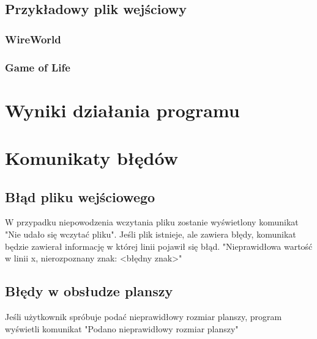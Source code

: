 \documentclass[10pt, oneside]{article}
\begin{document}
\subsection{Przykładowy plik wejściowy}
\subsubsection{WireWorld}


\subsubsection{Game of Life}

\section{Wyniki działania programu}

\section{Komunikaty błędów}
\subsection{Błąd pliku wejściowego}
W przypadku niepowodzenia wczytania pliku zostanie wyświetlony komunikat "Nie udało się wczytać pliku".
Jeśli plik istnieje, ale zawiera błędy, komunikat będzie zawierał informację w której linii pojawił się błąd. 
"Nieprawidłowa wartość w linii x, nierozpoznany znak: <błędny znak>"
\subsection{Błędy w obsłudze planszy}
Jeśli użytkownik spróbuje podać nieprawidłowy rozmiar planszy, program wyświetli komunikat "Podano nieprawidłowy rozmiar planszy"
\end{document}
